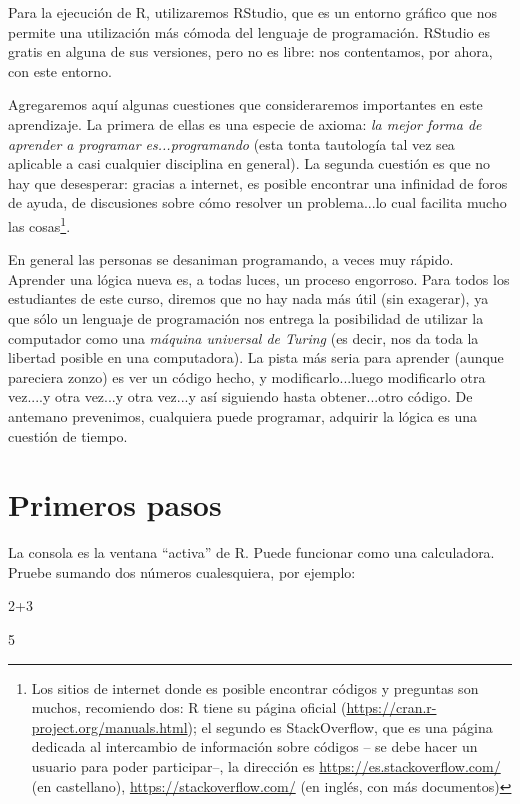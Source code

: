 \documentclass[11pt,a4paper]{article}
\begin{document}
Para la ejecución de R, utilizaremos RStudio, que es un entorno gráfico que nos permite una utilización más cómoda del lenguaje de programación. RStudio es gratis en alguna de sus versiones, pero no es libre: nos contentamos, por ahora, con este entorno.

Agregaremos aquí algunas cuestiones que consideraremos importantes en este aprendizaje. La primera de ellas es una especie de axioma: \textit{la mejor forma de aprender a programar es...programando} (esta tonta tautología tal vez sea aplicable a casi cualquier disciplina en general). La segunda cuestión es que no hay que desesperar: gracias a internet, es posible encontrar una infinidad de foros de ayuda, de discusiones sobre cómo resolver un problema...lo cual facilita mucho las cosas\footnote{Los sitios de internet donde es posible encontrar códigos y preguntas son muchos, recomiendo dos:  R tiene su página oficial (\url{https://cran.r-project.org/manuals.html}); el segundo es StackOverflow, que es una página dedicada al intercambio de información sobre códigos -- se debe hacer un usuario para poder participar--, la dirección es \url{https://es.stackoverflow.com/} (en castellano), \url{https://stackoverflow.com/} (en inglés, con más documentos)}.

En general las personas se desaniman programando, a veces muy rápido. Aprender una lógica nueva es, a todas luces, un proceso engorroso. Para todos los estudiantes de este curso, diremos que no hay nada más útil (sin exagerar), ya que sólo un lenguaje de programación nos entrega la posibilidad de utilizar la computador como una \textit{máquina universal de Turing} (es decir, nos da toda la libertad posible en una computadora). La pista más seria para aprender (aunque pareciera zonzo) es ver un código hecho, y modificarlo...luego modificarlo otra vez....y otra vez...y otra vez...y así siguiendo hasta obtener...otro código. De antemano prevenimos, cualquiera puede programar, adquirir la lógica es una cuestión de tiempo.


\section{Primeros pasos}

La consola es la ventana ``activa'' de R. Puede funcionar como una calculadora. Pruebe sumando dos números cualesquiera, por ejemplo:

\begin{Schunk}
\begin{Sinput}
 2+3
\end{Sinput}
\begin{Soutput}
[1] 5
\end{Soutput}
\end{Schunk}
\end{document}

